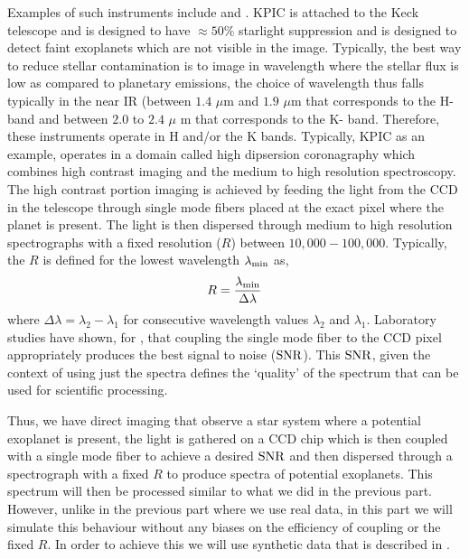 Examples of such instruments include \citep[KPIC, ][]{2019KPIC} and \citep[HARMONI, ]{2022Jocou}.
KPIC is attached to the Keck telescope and is designed to have $\approx 50\%$ starlight suppression and is designed to detect faint exoplanets which are not visible in the image.
Typically, the best way to reduce stellar contamination is to image in wavelength where the stellar flux is low as compared to planetary emissions, the choice of wavelength thus falls typically in the near IR (between $1.4$ $\mu$m  and $1.9$ $\mu$m that corresponds to the H-band and between $2.0$ to $2.4$ $\mu$ m that corresponds to the K- band.
Therefore, these instruments operate in H and/or the K bands.
Typically, KPIC as an example, operates in a domain called high dipsersion coronagraphy which combines high contrast imaging and the medium to high resolution spectroscopy.
The high contrast portion imaging is achieved by feeding the light from the CCD in the telescope through single mode fibers placed at the exact pixel where the planet is present.
The light is then dispersed through medium to high resolution spectrographs with a fixed resolution ($R$) between $10,000-100,000$.
Typically, the $R$ is defined for the lowest wavelength $\lambda_{\rm{min}}$ as,
\begin{equation}
    R =\dfrac{\lambda_{\rm{min}}}{\Delta \lambda}
\end{equation}
where $\Delta \lambda=\lambda_2-\lambda_1$ for consecutive wavelength values $\lambda_2$ and $\lambda_1$.
Laboratory studies have shown, for \citep[e.g][]{2021Calvin}, that coupling the single mode fiber to the CCD pixel appropriately produces the best signal to noise ($\rm{SNR}$).
This $\rm{SNR}$, given the context of using just the spectra defines the `quality' of the spectrum that can be used for scientific processing.

Thus, we have direct imaging that observe a star system where a potential exoplanet is present, the light is gathered on a CCD chip which is then coupled with a single mode fiber to achieve a desired $\rm{SNR}$ and then dispersed through a spectrograph with a fixed $R$ to produce spectra of potential exoplanets.
This spectrum will then be processed similar to what we did in the previous part.
However, unlike in the previous part where we use real data, in this part we will simulate this behaviour without any biases on the efficiency of coupling or the fixed $R$.
In order to achieve this we will use synthetic data that is described in .




